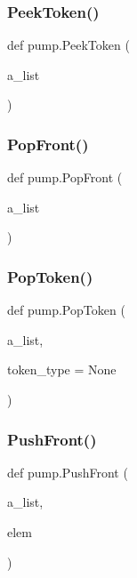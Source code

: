 \mbox{\label{namespacepump_ab12085e099ab4bd0cd968efdc435ec31}} 
\subsubsection{\texorpdfstring{Peek\+Token()}{PeekToken()}}
{\footnotesize\ttfamily def pump.\+Peek\+Token (\begin{DoxyParamCaption}\item[{}]{a\+\_\+list }\end{DoxyParamCaption})}

\mbox{\label{namespacepump_a8e2ff118da88397e88ccf68ebcd2df79}} 
\subsubsection{\texorpdfstring{Pop\+Front()}{PopFront()}}
{\footnotesize\ttfamily def pump.\+Pop\+Front (\begin{DoxyParamCaption}\item[{}]{a\+\_\+list }\end{DoxyParamCaption})}

\mbox{\label{namespacepump_a45e1d5d5c1c188fc53eee8bd1e00e6b0}} 
\subsubsection{\texorpdfstring{Pop\+Token()}{PopToken()}}
{\footnotesize\ttfamily def pump.\+Pop\+Token (\begin{DoxyParamCaption}\item[{}]{a\+\_\+list,  }\item[{}]{token\+\_\+type = {\ttfamily None} }\end{DoxyParamCaption})}

\mbox{\label{namespacepump_a12c70577eb727526ac0ad17bf3b6c3a4}} 
\subsubsection{\texorpdfstring{Push\+Front()}{PushFront()}}
{\footnotesize\ttfamily def pump.\+Push\+Front (\begin{DoxyParamCaption}\item[{}]{a\+\_\+list,  }\item[{}]{elem }\end{DoxyParamCaption})}

